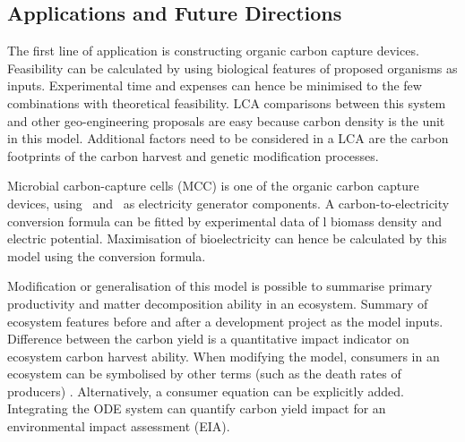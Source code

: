 \documentclass[../thesis.tex]{subfiles} %
\begin{document}

\subsection{Applications and Future Directions}
The first line of application is constructing organic carbon capture devices.  Feasibility can be calculated by using biological features of proposed organisms as inputs.  Experimental time and expenses can hence be minimised to the few combinations with theoretical feasibility.  LCA comparisons between this system and other geo-engineering proposals are easy because carbon density is the unit in this model.  Additional factors need to be considered in a LCA are the carbon footprints of the carbon harvest and genetic modification processes.

Microbial carbon-capture cells (MCC) \autocite{varanasi2020improvement,mohamed2020bioelectricity,neethu2018enhancement,pandit2012microbial} is one of the organic carbon capture devices, using \phy\ and \bac\ as electricity generator components.  A carbon-to-electricity conversion formula can be fitted by experimental data of \bac l biomass density and electric potential.  Maximisation of bioelectricity can hence be calculated by this model using the conversion formula.

Modification or generalisation of this model is possible to summarise primary productivity and matter decomposition ability in an ecosystem.  Summary of ecosystem features before and after a development project as the model inputs.  Difference between the carbon yield is a quantitative impact indicator on ecosystem carbon harvest ability.  When modifying the model, consumers in an ecosystem can be symbolised by other terms (such as the death rates of producers) \autocite{hurtt1996pelagic}.  Alternatively, a consumer equation can be explicitly added.  Integrating the ODE system can quantify carbon yield impact for an environmental impact assessment (EIA).
\end{document}
